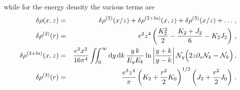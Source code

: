 \documentclass[notitlepage,showpacs,preprintnumbers,amsmath,amssymb,superscriptaddress,prd,onecolumn]{revtex4-1}
\begin{document}
while for the energy density the various terms are
\begin{eqnarray}
\delta\rho(x,z)
&=&
\delta\rho^{(2)}(x/z)
+
\delta\rho^{(2+\ln)}(x,z)
+
\delta\rho^{(3)}(x/z)
+\ldots
\,,
\\
\delta\rho^{(2)}(r)
&=&
e^2 z^4
\left(
\frac{K_2^2}{2}
-\frac{K_2+J_2}{6}
-K_2 J_2
\right)
\,,\\
\delta\rho^{(2+\ln)}(x,z)
&=&
\frac{e^2 x^2}{16\pi^4}
\int\!\!\!\int_0^\infty
{\rm d}y\,
{\rm d}k\,
\frac{y\,k}{E_y E_k}
\ln
\left|
\frac{y+k}{y-k}
\right|
\mathcal{N}_y
\Big(
2z \partial_z \mathcal{N}_k
- \mathcal{N}_k
\Big)
\,,\\
\delta\rho^{(3)}(r)
&=&
\frac{e^3z^4}{\pi}
\left(
K_2
+
\frac{r^2}{2} K_0
\right)^{1/2}
\left(
J_2
+
\frac{r^2}{2} J_0
\right)
\,.
\end{eqnarray}
\end{document}
